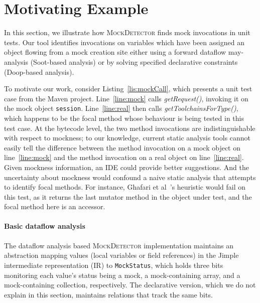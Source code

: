 \section{Motivating Example}
\label{sec:motivating-example}

In this section, we illustrate how \textsc{MockDetector} finds mock invocations in unit tests. Our tool identifies invocations on variables which have been assigned an object flowing from a mock creation site either using a forward dataflow may-analysis (Soot-based analysis) or by solving specified declarative constraints (Doop-based analysis).


To motivate our work, consider Listing~\ref{lis:mockCall}, which presents a unit test case from the Maven project. Line~\ref{line:mock} calls \textit{getRequest()}, invoking it on the mock object \texttt{session}. Line~\ref{line:real} then calls \textit{getToolchainsForType()}, which happens to be the focal method whose behaviour is being tested in this test case. At the bytecode level, the two method invocations are indistinguishable with respect to mockness; to our knowledge, current static analysis tools cannot easily tell the difference between the method invocation on a mock object on line~\ref{line:mock} and the method invocation on a real object on line~\ref{line:real}. Given mockness information, an IDE could provide better suggestions. And the uncertainty about mockness would confound a naive static analysis that attempts to identify focal methods. For instance, Ghafari et al~\cite{ghafari15:_autom}'s heuristic would fail on this test, as it returns the last mutator method in the object under test, and the focal method here is an accessor. 

\paragraph{Basic dataflow analysis} The dataflow analysis based \textsc{MockDetector} implementation maintains an abstraction mapping values (local variables or field references) in the Jimple intermediate representation (IR) to \texttt{MockStatus}, which holds three bits monitoring each value's status being a mock, a mock-containing array, and a mock-containing collection, respectively. The declarative version, which we do not explain in this section, maintains relations that track the same bits.

